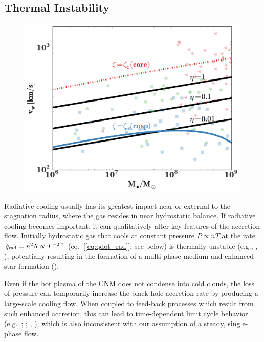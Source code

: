 \documentclass[usenatbib,fleqn]{mn2e}
\begin{document}
\subsection{Thermal Instability}
\label{sec:instability}


\begin{figure}
  \includegraphics[width=\columnwidth]{TI.pdf}
  \caption{
 }
\label{fig:TI}
\end{figure}

Radiative cooling usually has its greatest impact near or external to
the stagnation radius, where the gas resides in near hydrostatic
balance.  If radiative cooling becomes important, it can qualitatively
alter key features of the accretion flow. Initially hydrostatic gas
that cools at constant pressure $P \propto nT$ at the rate
$\dot{q}_{\rm rad} = n^{2}\Lambda \propto T^{-2.7}$
(eq.~[\ref{eq:qdot_rad}]; see below) is thermally unstable (e.g.,
\citealt{McCourt+12}, \citealt{Li&Bryan14a}), potentially resulting in
the formation of a multi-phase medium and enhanced star formation
(\citealt{Li&Bryan14b}).  

Even if the hot plasma of the CNM does not
condense into cold clouds, the loss of pressure can temporarily
increase the black hole accretion rate by producing a large-scale cooling flow.  When coupled to feed-back processes which result from such enhanced accretion, this can lead to
time-dependent limit cycle behavior (e.g.~\citealt{Ciotti&Ostriker07};
\citealt{Ciotti+10}; \citealt{Yuan&Li11}, \citealt{Gan+14}), which is
also inconsistent with our assumption of a steady, single-phase flow.
\end{document}
